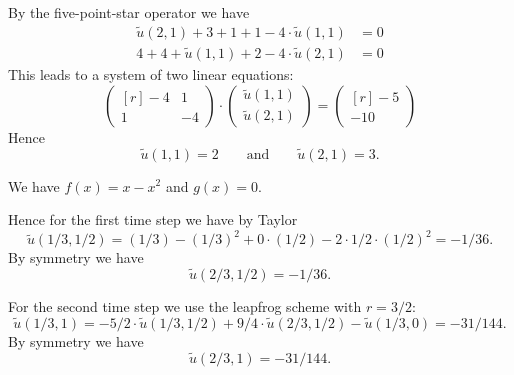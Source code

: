 \begin{loesung}
\begin{teilaufgaben}
\item
By the five-point-star operator we have
\begin{align*}
\tilde u(2,1) + 3 + 1 + 1 - 4 \cdot \tilde u(1,1) &= 0
\\
4 + 4 + \tilde u(1,1) + 2 - 4 \cdot \tilde u(2,1) &= 0
\end{align*}
This leads to a system of two linear equations:
\begin{equation}
\begin{pmatrix*}[r]
 -4 & 1 \\
  1 & -4
\end{pmatrix*}
\cdot
\begin{pmatrix}
\tilde u(1,1)  \\
\tilde u(2,1)
\end{pmatrix}
=
\begin{pmatrix*}[r]
 -5  \\
-10
\end{pmatrix*}
\tag{\bf 2P}
\end{equation}
Hence
\begin{equation}
\tilde u(1,1) = 2
\qquad\text{and}\qquad
\tilde u(2,1) = 3.
\tag{\bf 1P}
\end{equation}

\item
We have $f(x) = x-x^2$ and $g(x) = 0$. 

\smallskip

Hence for the first time step we have by Taylor
\[
\tilde u(1/3, 1/2)
=
(1/3)-(1/3)^2 + 0 \cdot (1/2) - 2 \cdot 1/2 \cdot (1/2)^2
=
- 1/36.
\]
By symmetry we have
\begin{equation}
\tilde u(2/3, 1/2) = - 1/36.
\tag{\bf 1P}
\end{equation}


For the second time step we use the leapfrog scheme with $r = 3/2$:
\[
\tilde u(1/3, 1)
=
-5/2 \cdot \tilde u(1/3, 1/2) + 9/4 \cdot \tilde u(2/3,1/2) - \tilde u(1/3,0)
=
-31/144.
\]
By symmetry we have
\begin{equation}
\tilde u(2/3, 1) = - 31/144.
\tag{\bf 2P}
\end{equation}
\end{teilaufgaben}
\end{loesung}

